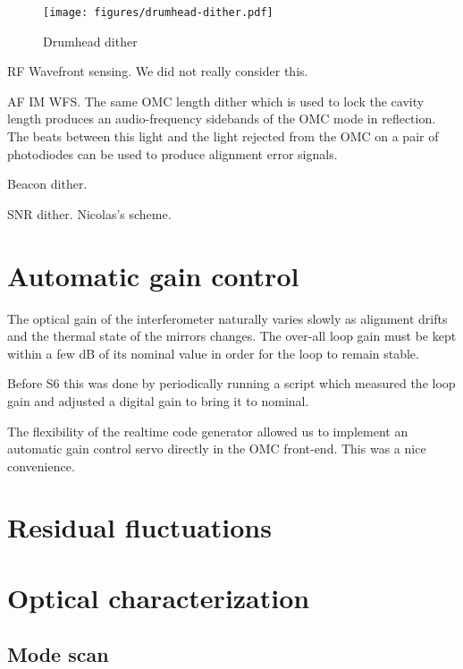 \begin{figure}
\texttt{[image: figures/drumhead-dither.pdf]}
\caption[Drumhead dither system]{Drumhead dither}
\end{figure}

RF Wavefront sensing.  We did not really consider this.

AF IM WFS.  The same OMC length dither which is used to lock the cavity
length produces an audio-frequency sidebands of the OMC mode in
reflection.  The beats between this light and the light rejected from
the OMC on a pair of photodiodes can be used to produce alignment
error signals.

Beacon dither.  

SNR dither.  Nicolas's scheme.

\section{Automatic gain control}

The optical gain of the interferometer naturally varies slowly as
alignment drifts and the thermal state of the mirrors changes.  The
over-all loop gain must be kept within a few dB of its nominal value
in order for the loop to remain stable.

Before S6 this was done by periodically running a script which
measured the loop gain and adjusted a digital gain to bring it to
nominal.

The flexibility of the realtime code generator allowed us to implement
an automatic gain control servo directly in the OMC front-end.  This
was a nice convenience. 

\section{Residual fluctuations}

\section{Optical characterization}

\subsection{Mode scan}

